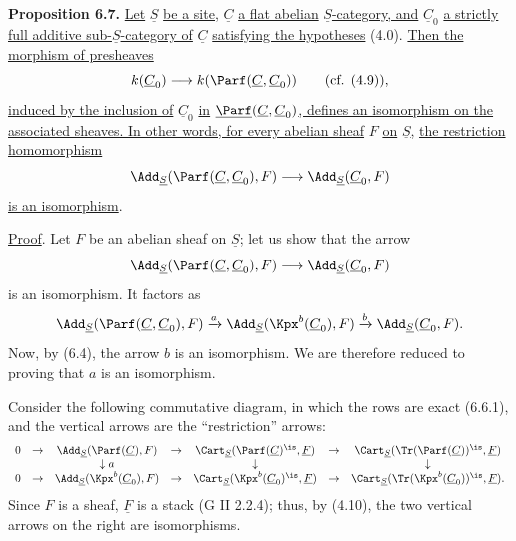 \textbf{Proposition 6.7.} \uline{Let} \(\underline{S}\) \uline{be a site,} \(\underline{C}\) \uline{a flat abelian} \(\underline{S}\)\uline{-category, and} \(\underline{C}_0\) \uline{a strictly full additive sub-}\(\underline{S}\)\uline{-category of} \(\underline{C}\) \uline{satisfying the hypotheses} (4.0). \uline{Then the morphism of presheaves}
\[
  k(\underline{C}_0)\longrightarrow k(\Parf(\underline{C},\underline{C}_0))\qquad(\text{cf. }(4.9)),
\]
\uline{induced by the inclusion of} \(\underline{C}_0\) \uline{in} \(\underline{\Parf}(\underline{C},\underline{C}_0)\)\uline{, defines an isomorphism on the associated sheaves. In other words, for every abelian sheaf} \(F\) \uline{on} \(\underline{S}\)\uline{,}
%
\uline{the restriction homomorphism}
\[
  \Add_{\underline{S}}(\Parf(\underline{C},\underline{C}_0),F)
  \longrightarrow
  \Add_{\underline{S}}(\underline{C}_0,F)
\]
\uline{is an isomorphism}.

\uline{Proof}. Let \(F\) be an abelian sheaf on \(\underline{S}\); let us show that the arrow
\[
  \Add_{\underline{S}}(\Parf(\underline{C},\underline{C}_0),F)
  \longrightarrow
  \Add_{\underline{S}}(\underline{C}_0,F)
\]
is an isomorphism. It factors as
\[
\Add_{\underline{S}}(\Parf(\underline{C},\underline{C}_0),F)
 \xrightarrow{a}
\Add_{\underline{S}}(\Kpx^b(\underline{C}_0),F)
 \xrightarrow{b}
\Add_{\underline{S}}(\underline{C}_0,F).
\]
Now, by (6.4), the arrow \(b\) is an isomorphism. We are therefore reduced to proving that \(a\) is an isomorphism.

Consider the following commutative diagram, in which the rows are exact (6.6.1), and the vertical arrows are the ``restriction'' arrows:
\[
\begin{array}{ccccccccc}
0&\to&\Add_{\underline{S}}(\Parf(\underline{C}),F)&\to&\Cart_{\underline{S}}(\Parf(\underline{C})^{\is},\underline F)&\to&\Cart_{\underline{S}}(\Tr(\Parf(\underline{C}))^{\is},\underline F)\\
&&\downarrow a&&\downarrow&&\downarrow\\
0&\to&\Add_{\underline{S}}(\Kpx^b(\underline{C}_0),F)&\to&\Cart_{\underline{S}}(\Kpx^b(\underline{C}_0)^{\is},\underline F)&\to&\Cart_{\underline{S}}(\Tr(\Kpx^b(\underline{C}_0))^{\is},\underline F).
\end{array}
\]
Since \(F\) is a sheaf, \(\underline F\) is a stack (G II 2.2.4); thus, by (4.10), the two vertical arrows on the right are isomorphisms.

